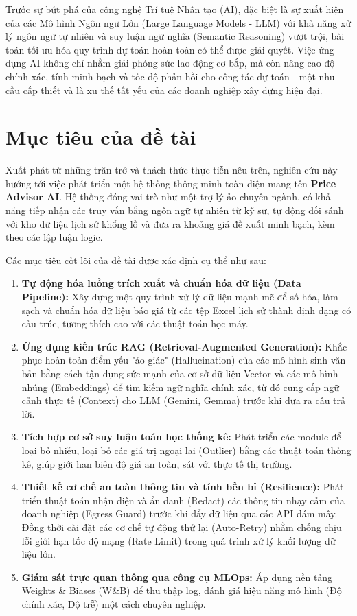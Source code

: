 Trước sự bứt phá của công nghệ Trí tuệ Nhân tạo (AI), đặc biệt là sự xuất hiện của các Mô hình Ngôn ngữ Lớn (Large Language Models - LLM) với khả năng xử lý ngôn ngữ tự nhiên và suy luận ngữ nghĩa (Semantic Reasoning) vượt trội, bài toán tối ưu hóa quy trình dự toán hoàn toàn có thể được giải quyết. Việc ứng dụng AI không chỉ nhằm giải phóng sức lao động cơ bắp, mà còn nâng cao độ chính xác, tính minh bạch và tốc độ phản hồi cho công tác dự toán - một nhu cầu cấp thiết và là xu thế tất yếu của các doanh nghiệp xây dựng hiện đại.

\section{Mục tiêu của đề tài}
Xuất phát từ những trăn trở và thách thức thực tiễn nêu trên, nghiên cứu này hướng tới việc phát triển một hệ thống thông minh toàn diện mang tên \textbf{Price Advisor AI}. Hệ thống đóng vai trò như một trợ lý ảo chuyên ngành, có khả năng tiếp nhận các truy vấn bằng ngôn ngữ tự nhiên từ kỹ sư, tự động đối sánh với kho dữ liệu lịch sử khổng lồ và đưa ra khoảng giá đề xuất minh bạch, kèm theo các lập luận logic.

Các mục tiêu cốt lõi của đề tài được xác định cụ thể như sau:
\begin{enumerate}
    \item \textbf{Tự động hóa luồng trích xuất và chuẩn hóa dữ liệu (Data Pipeline):} Xây dựng một quy trình xử lý dữ liệu mạnh mẽ để số hóa, làm sạch và chuẩn hóa dữ liệu báo giá từ các tệp Excel lịch sử thành định dạng có cấu trúc, tương thích cao với các thuật toán học máy.
    \item \textbf{Ứng dụng kiến trúc RAG (Retrieval-Augmented Generation):} Khắc phục hoàn toàn điểm yếu "ảo giác" (Hallucination) của các mô hình sinh văn bản bằng cách tận dụng sức mạnh của cơ sở dữ liệu Vector và các mô hình nhúng (Embeddings) để tìm kiếm ngữ nghĩa chính xác, từ đó cung cấp ngữ cảnh thực tế (Context) cho LLM (Gemini, Gemma) trước khi đưa ra câu trả lời.
    \item \textbf{Tích hợp cơ sở suy luận toán học thống kê:} Phát triển các module để loại bỏ nhiễu, loại bỏ các giá trị ngoại lai (Outlier) bằng các thuật toán thống kê, giúp giới hạn biên độ giá an toàn, sát với thực tế thị trường.
    \item \textbf{Thiết kế cơ chế an toàn thông tin và tính bền bỉ (Resilience):} Phát triển thuật toán nhận diện và ẩn danh (Redact) các thông tin nhạy cảm của doanh nghiệp (Egress Guard) trước khi đẩy dữ liệu qua các API đám mây. Đồng thời cài đặt các cơ chế tự động thử lại (Auto-Retry) nhằm chống chịu lỗi giới hạn tốc độ mạng (Rate Limit) trong quá trình xử lý khối lượng dữ liệu lớn.
    \item \textbf{Giám sát trực quan thông qua công cụ MLOps:} Áp dụng nền tảng Weights \& Biases (W\&B) để thu thập log, đánh giá hiệu năng mô hình (Độ chính xác, Độ trễ) một cách chuyên nghiệp.
\end{enumerate}

